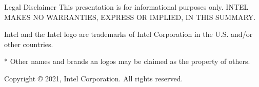 
\begin{frame}[c]{Legal Disclaimer}
  This presentation is for informational purposes only.
  INTEL MAKES NO WARRANTIES, EXPRESS OR IMPLIED, IN THIS SUMMARY.

  \vspace{\baselineskip}
  Intel and the Intel logo are trademarks of Intel Corporation in the
  U.S. and/or other countries.

  \vspace{\baselineskip}
  * Other names and brands an logos may be claimed as the property of others.

  \vspace{\baselineskip}
  Copyright © 2021, Intel Corporation. All rights reserved.
\end{frame}
